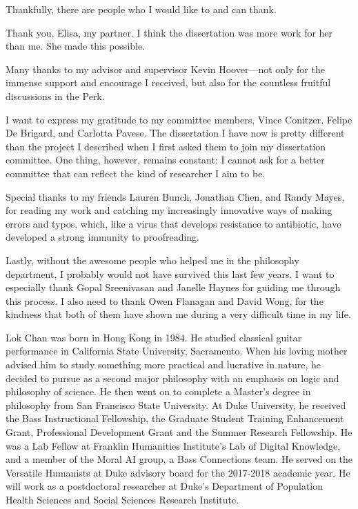 \documentclass[PhD]{dukethesis2006}
\begin{document}
Thankfully, there are people who I would like to and can thank.

Thank you, Elisa, my partner. I think the dissertation was more work for her than me. She made this possible. 

Many thanks to my advisor and supervisor Kevin Hoover---not only for the immense support and encourage I received, but also for the countless fruitful discussions in the Perk. 

I want to express my gratitude to my committee members, Vince Conitzer, Felipe De Brigard, and Carlotta Pavese. The dissertation I have now is pretty different than the project I described when I first asked them to join my dissertation committee. One thing, however, remains constant: I cannot ask for a better committee that can reflect the kind of researcher I aim to be. 

Special thanks to my friends Lauren Bunch, Jonathan Chen, and Randy Mayes, for reading my work and catching my increasingly innovative ways of making errors and typos, which, like a virus that develops resistance to antibiotic, have developed a strong immunity to proofreading.

Lastly, without the awesome people who helped me in the philosophy department, I probably would not have survived this last few years. I want to especially thank Gopal Sreenivasan and Janelle Haynes for guiding me through this process. I also need to thank Owen Flanagan and David Wong, for the kindness that both of them have shown me during a very difficult time in my life. 









\printbibliography[heading=bibintoc]

\biography

	Lok Chan was born in Hong Kong in 1984. He studied classical guitar performance in California State University, Sacramento. When his loving mother advised him to study something more practical and lucrative in nature, he decided to pursue as a second major philosophy with an emphasis on logic and philosophy of science. He then went on to complete a Master's degree in philosophy from San Francisco State University. At Duke University, he received the Bass Instructional Fellowship, the Graduate Student Training Enhancement Grant, Professional Development Grant and the Summer Research Fellowship. He was a Lab Fellow at Franklin Humanities Institute's Lab of Digital Knowledge, and a member of the Moral AI group, a Bass Connections team. He served on the Versatile Humanists at Duke advisory board for the 2017-2018 academic year. He will work as a postdoctoral researcher at Duke's Department of Population Health Sciences and Social Sciences Research Institute.
\end{document}

